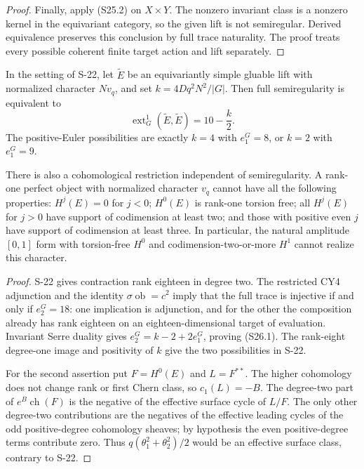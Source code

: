 \begin{proof}
Finally, apply (S25.2) on $X\times Y$. The nonzero
invariant class is a nonzero kernel in the equivariant
category, so the given lift is not semiregular. Derived
equivalence preserves this conclusion by full trace
naturality. The proof treats every possible coherent
finite target action and lift separately.
\end{proof}

\begin{proposition}
\label{prop:semireg-rm-tangent-gate}
In the setting of S-22, let $\widetilde E$ be an
equivariantly simple gluable lift with normalized
character $Nv_q$, and set
$k=4Dq^2N^2/|G|$.
Then full semiregularity is equivalent to
\[
 \operatorname{ext}^1_G(\widetilde E,\widetilde E)
        =10-\frac{k}{2}.
 \tag{S26.1}
\]
The positive-Euler possibilities are exactly $k=4$ with
$e_1^G=8$, or $k=2$ with $e_1^G=9$.

There is also a cohomological restriction independent of
semiregularity. A rank-one perfect object with normalized
character $v_q$ cannot have all the following properties:
$H^j(E)=0$ for $j<0$; $H^0(E)$ is rank-one torsion free;
all $H^j(E)$ for $j>0$ have support of codimension at least
two; and those with positive even $j$ have support of
codimension at least three. In particular, the natural
amplitude $[0,1]$ form with torsion-free $H^0$ and
codimension-two-or-more $H^1$ cannot realize this character.
\end{proposition}
\begin{proof}
S-22 gives contraction rank eighteen in degree two.
The restricted CY4 adjunction and the identity
$\sigma\operatorname{ob}=c^2$ imply that the full trace
is injective if and only if $e_2^G=18$: one implication
is adjunction, and for the other the composition already
has rank eighteen on an eighteen-dimensional target
of evaluation. Invariant Serre duality gives
$e_2^G=k-2+2e_1^G$, proving (S26.1).
The rank-eight degree-one image and positivity of $k$
give the two possibilities in S-22.

For the second assertion put $F=H^0(E)$ and
$L=F^{**}$. The higher cohomology does not change rank
or first Chern class, so $c_1(L)=-B$.
The degree-two part of $e^B\operatorname{ch}(F)$ is the
negative of the effective surface cycle of $L/F$.
The only other degree-two contributions are the negatives
of the effective leading cycles of the odd positive-degree
cohomology sheaves; by hypothesis the even positive-degree
terms contribute zero. Thus
$q(\theta_1^2+\theta_2^2)/2$ would be an effective
surface class, contrary to S-22.
\end{proof}

